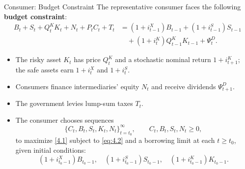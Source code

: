 \documentclass[11pt,aspectratio=169]{beamer}
\begin{document}
\begin{frame}{Consumer: Budget Constraint}
\small
The representative consumer faces the following \textbf{budget constraint}:
\begin{align}
B_t + S_t + Q_t^K K_t + N_t + P_t C_t + T_t
&= (1+i_{t-1}^X) B_{t-1} + (1+i_{t-1}^S) S_{t-1} \nonumber \\
&\quad + (1+i_t^K) Q_{t-1}^K K_{t-1}+ \Psi_t^D.
\label{eq:4.2}
\end{align}

\begin{itemize}
\item The risky asset $K_t$ has price $Q_t^K$ and a stochastic nominal return $1+i_{t+1}^K$; the safe assets earn $1+i_t^X$ and $1+i_t^S$.
\vspace{0.3em}

\item Consumers finance intermediaries’ equity $N_t$ and receive dividends $\Psi_{t+1}^D$.
\vspace{0.3em}

\item The government levies lump-sum taxes $T_t$.
\vspace{0.3em}

\item The consumer chooses sequences  
\[
\{C_t, B_t, S_t, K_t, N_t\}_{t=t_0}^\infty,\qquad 
C_t, B_t, S_t, N_t \ge 0,
\]
to maximize \eqref{4.1} subject to \eqref{eq:4.2} and a borrowing limit at each $t\ge t_0$, given initial conditions:
\[
(1+i_{t_0-1}^X)B_{t_0-1},\quad
(1+i_{t_0-1}^S)S_{t_0-1},\quad
(1+i_{t_0-1}^K)K_{t_0-1}.
\]
\end{itemize}
\end{frame}
\end{document}
